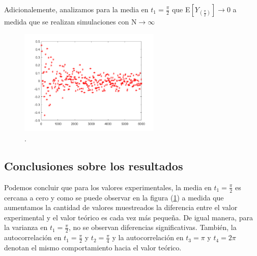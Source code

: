 Adicionalemente, analizamos para la media en $t_1 = \frac{\pi}{2}$ que E$\left[ Y_{(\frac{\pi}{2})}\right]\rightarrow 0$ a medida que se realizan simulaciones con N$\rightarrow \infty$
\begin{figure}[H]
\centering
	\includegraphics[width=0.6\textwidth, trim = {0 0 0 0},clip]{./ImagenesEjercicio1/media.png}
	\caption{.}
	\label{fig:media}
\end{figure}

\subsection{Conclusiones sobre los resultados}

Podemos concluir que para los valores experimentales, la media en $t_1 = \frac{\pi}{2}$ es cercana a cero y como se puede observar en la figura (\ref{fig:media}) a medida que aumentamos la cantidad de valores muestreados la diferencia entre el valor experimental y el valor teórico es cada vez más pequeña. De igual manera, para la varianza en $t_1 = \frac{\pi}{2}$, no se observan diferencias significativas.
También, la autocorrelación en $t_1 = \frac{\pi}{2}$ y $t_2 = \frac{\pi}{4}$ y la autocorrelación en $t_3 = \pi$ y $t_4 = 2\pi$ denotan el mismo comportamiento hacia el valor teórico. 





